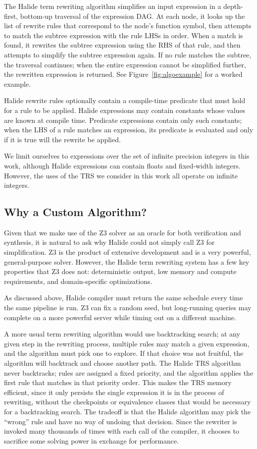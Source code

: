\documentclass[sigplan,10pt,review,anonymous]{acmart}\settopmatter{printfolios=true,printccs=false,printacmref=false}
\begin{document}
The Halide term rewriting algorithm simplifies an input expression in a
depth-first, bottom-up traversal of the expression DAG. At each node, it looks
up the list of rewrite rules that correspond to the node's function symbol, then
attempts to match the subtree expression with the rule LHSs in order. When a
match is found, it rewrites the subtree expression using the RHS of that rule,
and then attempts to simplify the subtree expression again. If no rule matches
the subtree, the traversal continues; when the entire expression cannot be
simplified further, the rewritten expression is returned. See Figure~\ref{fig:algoexample} for a worked example. 

Halide rewrite rules optionally contain a compile-time predicate that must hold for a rule to
be applied. Halide expressions may contain constants whose values are known at
compile time. Predicate expressions contain only such constants; when the
LHS of a rule matches an expression, its predicate is evaluated and only if it
is true will the rewrite be applied.

We limit ourselves to expressions over the set of infinite precision integers in
this work, although Halide expressions can contain floats and fixed-width
integers. However, the uses of the TRS we consider in this work all operate
on infinite integers.

\subsection{Why a Custom Algorithm?}

Given that we make use of the Z3 solver as an oracle for both verification and synthesis, it is natural to ask why Halide could not simply call Z3 for simplification. Z3 is the product of extensive development and is a very powerful, general-purpose solver. However, the Halide term rewriting system has a few key properties that Z3 does not: deterministic output, low memory and compute requirements, and domain-specific optimizations.

As discussed above, Halide compiler must return the same schedule every time the same pipeline is run. Z3 can fix a random seed, but long-running queries may complete on a more powerful server while timing out on a different machine.

A more usual term rewriting algorithm would use backtracking search; at any given step in the rewriting process, multiple rules may match a given expression, and the algorithm must pick one to explore. If that choice was not fruitful, the algorithm will backtrack and choose another path. The Halide TRS algorithm never backtracks; rules are assigned a fixed priority, and the algorithm applies the first rule that matches in that priority order. This makes the TRS memory efficient, since it only persists the single expression it is in the process of rewriting, without the checkpoints or equivalence classes that would be necessary for a backtracking search. The tradeoff is that the Halide algorithm may pick the ``wrong'' rule and have no way of undoing that decision. Since the rewriter is invoked many thousands of times with each call of the compiler, it chooses to sacrifice some solving power in exchange for performance. 
\end{document}
